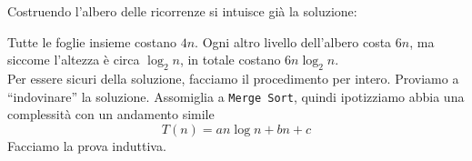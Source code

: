Costruendo l'albero delle ricorrenze si intuisce già la soluzione:
\begin{center}
\end{center}
Tutte le foglie insieme costano $4n$. Ogni altro livello dell'albero costa $6n$, ma siccome l'altezza è circa $\log_2 n$, in totale costano $6n \log_2 n$. \\ 

Per essere sicuri della soluzione, facciamo il procedimento per intero.
Proviamo a ``indovinare'' la soluzione. Assomiglia a \texttt{Merge Sort},
quindi ipotizziamo abbia una complessità con un andamento simile 
\begin{displaymath}
	T(n) = an \log n + bn + c
\end{displaymath}
Facciamo la prova induttiva.

